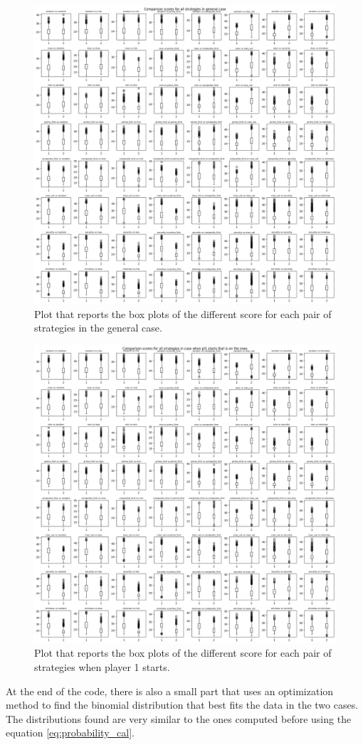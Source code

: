 \begin{figure}
    \centering
    \includegraphics[width=1\linewidth]{img/box_plot_general.png}
    \caption{Plot that reports the box plots of the different score for each pair of strategies in the general case.}
    \label{fig:box_general}
\end{figure}

\begin{figure}
    \centering
    \includegraphics[width=1\linewidth]{img/box_plot_starts.png}
    \caption{Plot that reports the box plots of the different score for each pair of strategies when player 1 starts.}
    \label{fig:box_starts}
\end{figure}

At the end of the code, there is also a small part that uses an optimization method to find the binomial distribution that best fits the data in the two cases. The distributions found are very similar to the ones computed before using the equation \ref{eq:probability_cal}.